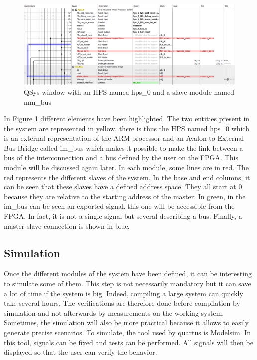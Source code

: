 \begin{figure}[H]
    \centering
    \includegraphics[width=\linewidth]{Chapter2-FPGA_Flow/res/qsys.PNG}
    \caption{QSys window with an HPS named hps\_0 and a slave module named mm\_bus}
    \label{fig:tools/qsys}
\end{figure}

In Figure \ref{fig:tools/qsys} different elements have been highlighted. The two entities present in the system are 
represented in yellow, there is thus the HPS named hps\_0 which is an external representation of the 
ARM processor and an Avalon to External Bus Bridge called im\_bus which makes it possible to make 
the link between a bus of the interconnection and a bus defined by the user on the FPGA. This module 
will be discussed again later. In each module, some lines are in red. The red represents the 
different slaves of the system. In the base and end columns, it can be seen that these slaves have 
a defined address space. They all start at 0 because they are relative to the starting address of 
the master. In green, in the im\_bus can be seen an exported signal, this one will be accessible 
from the FPGA. In fact, it is not a single signal but several describing a bus. Finally, a 
master-slave connection is shown in blue.

\subsection{Simulation}

Once the different modules of the system have been defined, it can be interesting to simulate some 
of them. This step is not necessarily mandatory but it can save a lot of time if the system is big. 
Indeed, compiling a large system can quickly take several hours. The verifications are therefore 
done before compilation by simulation and not afterwards by measurements on the working system. 
Sometimes, the simulation will also be more practical because it allows to easily generate precise 
scenarios. To simulate, the tool used by quartus is Modelsim. In this tool, signals can be fixed 
and tests can be performed. All signals will then be displayed so that the user can verify the 
behavior.

